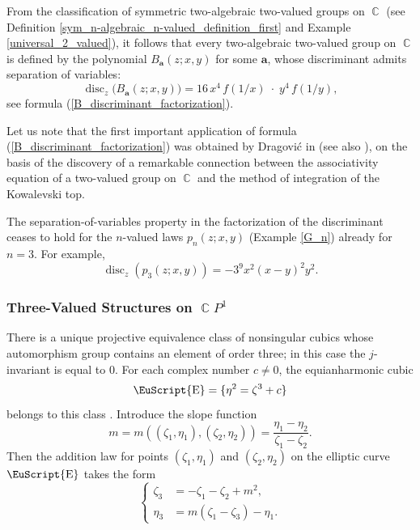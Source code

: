 \documentclass[14pt, dvipsnames]{extarticle}
\theoremstyle{plain}
\theoremstyle{definition}
\theoremstyle{remark}
\DeclareMathOperator{\disc}{\mathrm{disc}}
\DeclareMathOperator{\E}{\EuScript{E}}
\DeclareMathOperator{\Cc}{\mathbb{C}}
\begin{document}
From the classification \cite[Theorem 6.3]{Buchstaber_Veselov19} of symmetric two-algebraic two-valued groups on $\Cc$ (see Definition \ref{sym_n-algebraic_n-valued_definition_first} and Example \ref{universal_2_valued}), it follows that every two-algebraic two-valued group on $\Cc$ is defined by the polynomial $B_{\boldsymbol{a}}(z; x, y)$ for some $\boldsymbol{a}$, whose discriminant admits separation of variables:
$$\disc_z\bigl(B_{\boldsymbol{a}}(z;x,y)\bigr)=16\,x^4\,f(1/x)\;\cdot\; y^4\,f(1/y),$$
see formula (\ref{B_discriminant_factorization}). 

Let us note that the first important application of formula (\ref{B_discriminant_factorization}) was obtained by Dragovi\'c in \cite{Dragovic10} (see also \cite{Dragovic14}), on the basis of the discovery of a remarkable connection between the associativity equation of a two-valued group on $\Cc$ and the method of integration of the Kowalevski top.

The separation-of-variables property in the factorization of the discriminant ceases to hold for the $n$-valued laws $p_n(z; x, y)$ (Example \ref{G_n}) already for $n = 3$. For example,
$$\disc_z(p_3(z; x, y)) = -3^9x^2(x-y)^2y^2.$$  






\subsubsection{Three-Valued Structures on $\Cc\!P^1$}

There is a unique projective equivalence class of nonsingular cubics whose automorphism group contains an element of order three; in this case the $j$-invariant is equal to $0$. For each complex number $c\neq 0$, the equianharmonic cubic
$$\E = \{\eta^2 = \zeta^3 + c\}$$
belongs to this class \cite[Theorem 3.1.3]{Dolgachev}. Introduce the slope function
$$m = m((\zeta_1, \eta_1), (\zeta_2, \eta_2)) = \frac{\eta_1 - \eta_2}{\zeta_1 - \zeta_2}.$$
Then the addition law for points $(\zeta_1, \eta_1)$ and $(\zeta_2, \eta_2)$ on the elliptic curve $\E$ takes the form
\begin{equation}\label{sum_formula}
\left\{\begin{aligned}
\zeta_3 &= -\zeta_1 - \zeta_2 + m^2,\nonumber\\
\eta_3 &= m(\zeta_1 - \zeta_3) - \eta_1.
\end{aligned}\right.
\end{equation} 
\end{document}
